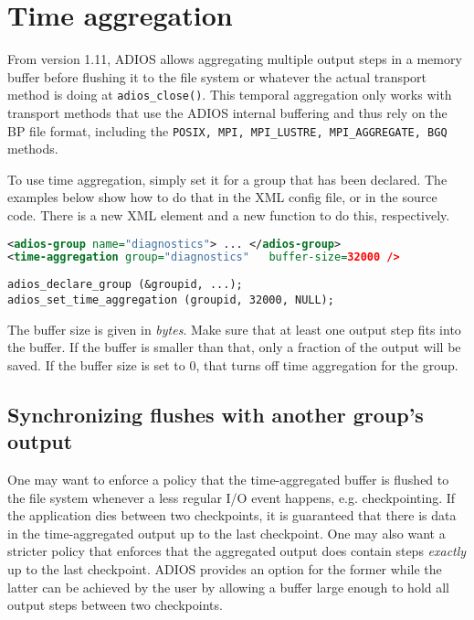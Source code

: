 \chapter{Time aggregation}

From version 1.11, ADIOS allows aggregating multiple output steps in a memory buffer before flushing it to the file system or whatever the actual transport method is doing at \verb+adios_close()+. This temporal aggregation only works with transport methods that use the ADIOS internal buffering and thus rely on the BP file format, including the \verb+POSIX, MPI, MPI_LUSTRE, MPI_AGGREGATE, BGQ+ methods.

To use time aggregation, simply set it for a group that has been declared. The examples below show how to do that in the XML config file, or in the source code. There is a new XML element and a new function to do this, respectively. 

\begin{lstlisting}[language=XML,caption=Set time aggregation for a group in XML]
<adios-group name="diagnostics"> ... </adios-group>    
<time-aggregation group="diagnostics"   buffer-size=32000 />
\end{lstlisting}

\begin{lstlisting}[caption=Set time aggregation for a group in source code]
adios_declare_group (&groupid, ...);
adios_set_time_aggregation (groupid, 32000, NULL);
\end{lstlisting}

The buffer size is given in {\em bytes}. Make sure that at least one output step fits into the buffer. If the buffer is smaller than that, only a fraction of the output will be saved. If the buffer size is set to $0$, that turns off time aggregation for the group.


\section{Synchronizing flushes with another group's output}

One may want to enforce a policy that the time-aggregated buffer is flushed to the file system whenever a less regular I/O event happens, e.g. checkpointing. If the application dies between two checkpoints, it is guaranteed that there is data in the time-aggregated output up to the last checkpoint. One may also want a stricter policy that enforces that the aggregated output does contain steps {\em exactly} up to the last checkpoint. ADIOS provides an option for the former while the latter can be achieved by the user by allowing a buffer large enough to hold all output steps between two checkpoints.  

